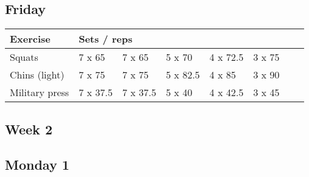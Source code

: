 \documentclass[12pt, a4paper]{article}%
\begin{document}
  \subsection*{\hspace{0.5em} Friday }


  \begin{tabular}{l|lllllll}
  \hspace{0.75em} \textbf{Exercise} & \multicolumn{ 7 }{l}{ \textbf{Sets / reps} } \\ \hline

            \hspace{0.75em} Squats
            & 7 x 65
            & 7 x 65
            & 5 x 70
            & 4 x 72.5
            & 3 x 75
            & 
            & 
            \\


            \hspace{0.75em} Chins (light)
            & 7 x 75
            & 7 x 75
            & 5 x 82.5
            & 4 x 85
            & 3 x 90
            & 
            & 
            \\


            \hspace{0.75em} Military press
            & 7 x 37.5
            & 7 x 37.5
            & 5 x 40
            & 4 x 42.5
            & 3 x 45
            & 
            & 
            \\


  \end{tabular}


\clearpage \subsection*{\hspace{0.25em} Week 2 }
  \subsection*{\hspace{0.5em} Monday 1 }
\end{document}
